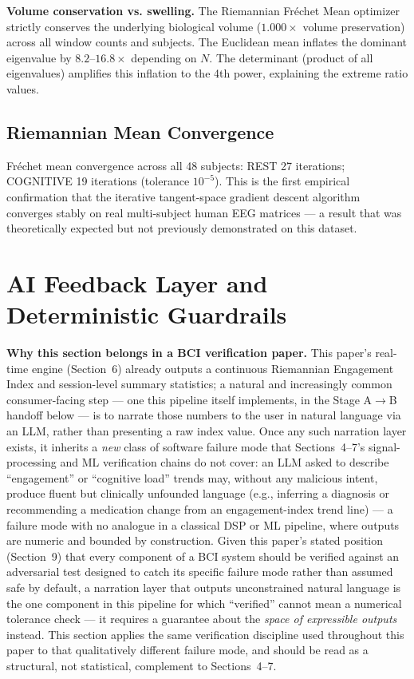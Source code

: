 \documentclass[11pt]{article}
\begin{document}
\textbf{Volume conservation vs. swelling.} The Riemannian Fr\'echet Mean optimizer strictly conserves the underlying biological volume ($1.000\times$ volume preservation) across all window counts and subjects. The Euclidean mean inflates the dominant eigenvalue by $8.2$--$16.8\times$ depending on $N$. The determinant (product of all eigenvalues) amplifies this inflation to the 4th power, explaining the extreme ratio values.

\subsection{Riemannian Mean Convergence}

Fr\'echet mean convergence across all 48 subjects: REST 27 iterations; COGNITIVE 19 iterations (tolerance $10^{-5}$). This is the first empirical confirmation that the iterative tangent-space gradient descent algorithm converges stably on real multi-subject human EEG matrices --- a result that was theoretically expected but not previously demonstrated on this dataset.

\section{AI Feedback Layer and Deterministic Guardrails}

\textbf{Why this section belongs in a BCI verification paper.} This paper's real-time engine (Section~6) already outputs a continuous Riemannian Engagement Index and session-level summary statistics; a natural and increasingly common consumer-facing step --- one this pipeline itself implements, in the Stage A$\to$B handoff below --- is to narrate those numbers to the user in natural language via an LLM, rather than presenting a raw index value. Once any such narration layer exists, it inherits a \emph{new} class of software failure mode that Sections~4--7's signal-processing and ML verification chains do not cover: an LLM asked to describe ``engagement'' or ``cognitive load'' trends may, without any malicious intent, produce fluent but clinically unfounded language (e.g., inferring a diagnosis or recommending a medication change from an engagement-index trend line) --- a failure mode with no analogue in a classical DSP or ML pipeline, where outputs are numeric and bounded by construction. Given this paper's stated position (Section~9) that every component of a BCI system should be verified against an adversarial test designed to catch its specific failure mode rather than assumed safe by default, a narration layer that outputs unconstrained natural language is the one component in this pipeline for which ``verified'' cannot mean a numerical tolerance check --- it requires a guarantee about the \emph{space of expressible outputs} instead. This section applies the same verification discipline used throughout this paper to that qualitatively different failure mode, and should be read as a structural, not statistical, complement to Sections~4--7.
\end{document}

